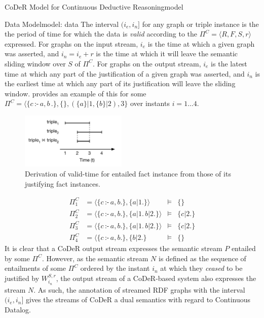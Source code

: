 \begin{nestedsection}{CoDeR Model for Continuous Deductive Reasoning}{model}
\begin{nestedsection}{Data Model}{model: data}
		The interval ${(i_e,i_n]}$ for any graph or triple instance is the the period of time for which the data is \emph{valid} \citep{SemanticStreamingManagement,sparkwave} according to the ${\Pi^C = \langle R, F, S, r \rangle}$ expressed.
		For graphs on the input stream, $i_e$ is the time at which a given graph was asserted, and ${i_n = i_e + r}$ is the time at which it will leave the semantic sliding window over $S$ of $\Pi^C$.
		For graphs on the output stream, $i_e$ is the latest time at which any part of the justification of a given graph was asserted, and $i_n$ is the earliest time at which any part of its justification will leave the sliding window.
		 provides an example of this for some ${\Pi^C = \langle \{c\,\text{:-}\,a,b\,.\},\{\},(\{a\}|1,\{b\}|2),3\}}$ over instants ${i = 1 \dots 4}$.
		\begin{figure}
			\centering
			\includegraphics[width=0.45\textwidth]{intersected-intervals}
			\caption{Derivation of valid-time for entailed fact instance from those of its justifying fact instances.}
		\end{figure}
		\begin{align*}
			\Pi^C_{1} & = \langle \{c\,\text{:-}\,a,b.\}, \{ a|1. \} \rangle & \vDash & \{ \} \\
			\Pi^C_{2} & = \langle \{c\,\text{:-}\,a,b.\}, \{ a|1. \, b|2. \} \rangle & \vDash & \{ c|2. \} \\
			\Pi^C_{3} & = \langle \{c\,\text{:-}\,a,b.\}, \{ a|1. \, b|2. \} \rangle & \vDash & \{ c|2. \} \\
			\Pi^C_{4} & = \langle \{c\,\text{:-}\,a,b.\}, \{ b|2. \} & \vDash & \{ \}
		\end{align*}
		It is clear that a CoDeR output stream expresses the semantic stream $P$ entailed by some $\Pi^C$.
		However, as the semantic stream $N$ is defined as the sequence of entailments of some $\Pi^C$ ordered by the instant $i_{n}$ at which they \emph{ceased} to be justified by $W^{S,r}_{i_n}$, the output stream of a CoDeR-based system also expresses the stream $N$.
		As such, the annotation of streamed RDF graphs with the interval $(i_e,i_n]$ gives the streams of CoDeR a dual semantics with regard to Continuous Datalog.


\end{nestedsection}
\end{nestedsection}
